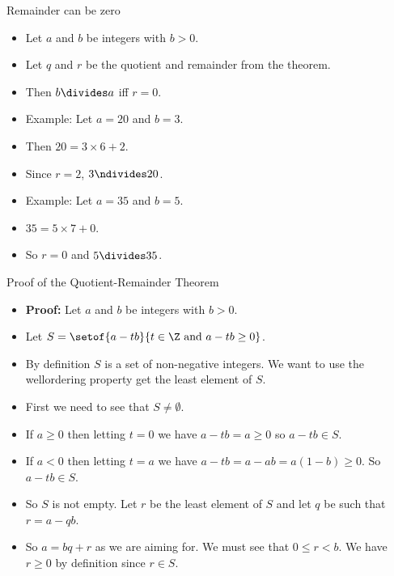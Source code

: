 \documentclass[handout]{beamer}
\begin{document}
\begin{frame}{Remainder can be zero}


\begin{itemize}
  \item Let $a$ and $b$ be integers with $b>0$.
  \item Let $q$ and $r$ be the quotient and remainder from the theorem.
  \item Then $b\divides a$ iff $r=0$.
  \item Example: Let $a=20$ and $b=3$.
  \item Then $20 = 3 \times 6 + 2$.
  \item Since $r=2$, $3\ndivides 20$.
  \item Example: Let $a=35$ and $b=5$.
  \item $35 = 5 \times 7 + 0$.
  \item So $r=0$ and $5\divides 35$.
\end{itemize}

\end{frame}

\begin{frame}{Proof of the Quotient-Remainder Theorem}


\begin{itemize}
  \item \textbf{Proof:} Let $a$ and $b$ be integers with $b>0$.
  \item Let $S = \setof{a-tb}{t\in\Z\text{ and }a-tb\geq 0}$.
  \item By definition $S$ is a set of non-negative integers. We want to use
  the wellordering property get the least element of $S$.
  \item First we need to see that $S\not=\emptyset$.
  \item If $a\geq 0$ then letting $t=0$ we have $a-tb = a \geq 0$ so $a-tb\in S$.
  \item If $a < 0$ then letting $t=a$ we have $a-tb=a-ab = a (1-b) \geq 0$. So $a-tb\in S$.
  \item So $S$ is not empty. Let $r$ be the least element of $S$ and let $q$ be such that $r=a-qb$.
  \item So $a=bq+r$ as we are aiming for. We must see that $0\leq r < b$. We have $r\geq 0$ by definition since $r\in S$.
\end{itemize}

\end{frame}
\end{document}
